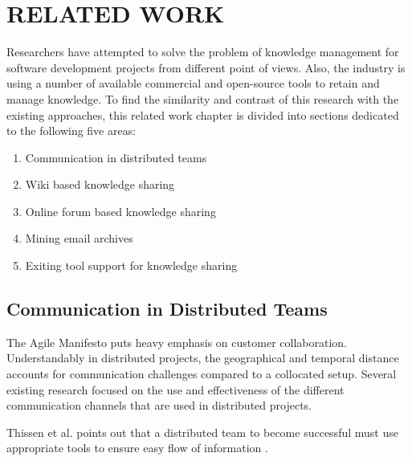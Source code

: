 \fancyhead[RO,LE]{\thepage}
\fancyfoot{} 
\chapter{RELATED WORK}
Researchers have attempted to solve the problem of knowledge management for software development projects from different point of views. Also, the industry is using a number of available commercial and open-source tools to retain and manage knowledge. To find the similarity and contrast of this research with the existing approaches, this related work chapter is divided into sections dedicated to the following five areas:

\begin{enumerate}
	\item Communication in distributed teams
	\item Wiki based knowledge sharing
	\item Online forum based knowledge sharing
	\item Mining email archives
	\item Exiting tool support for knowledge sharing
\end{enumerate}

\section{Communication in Distributed Teams}
The Agile Manifesto\cite{agile_manifesto} puts heavy emphasis on customer collaboration. Understandably in distributed projects, the geographical and temporal distance accounts for communication challenges compared to a collocated setup. Several existing research focused on the use and effectiveness of the different communication channels that are used in distributed projects.

Thissen et al. points out that a distributed team to become successful must use appropriate tools to ensure easy flow of information \cite{communication_tools}.
